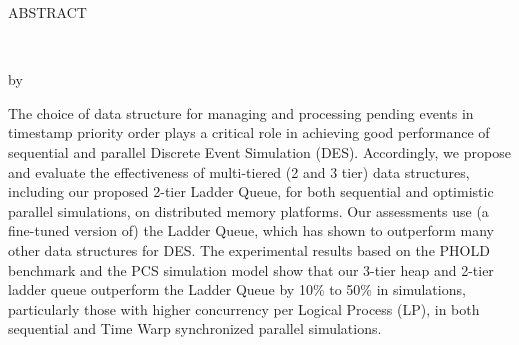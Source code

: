\thispagestyle{empty}
\begin{center}
\MakeUppercase{ABSTRACT}\\
\vspace*{1\baselineskip}

\MakeUppercase{\thetitle}\\
\vspace*{2\baselineskip}

by \theauthor
\end{center}

\vspace*{4\baselineskip}

\begin{flushleft}
  The choice of data structure for managing and processing pending
  events in timestamp priority order plays a critical role in
  achieving good performance of sequential and parallel Discrete Event
  Simulation (DES).  Accordingly, we propose and evaluate the
  effectiveness of multi-tiered (2 and 3 tier) data structures,
  including our proposed 2-tier Ladder Queue, for both sequential and
  optimistic parallel simulations, on distributed memory platforms.
  Our assessments use (a fine-tuned version of) the Ladder Queue,
  which has shown to outperform many other data structures for DES.
  The experimental results based on the PHOLD benchmark and the PCS simulation model show that our
  3-tier heap and 2-tier ladder queue outperform the Ladder Queue by
  10\% to 50\% in simulations, particularly those with higher
  concurrency per Logical Process (LP), in both sequential and Time
  Warp synchronized parallel simulations. 
\end{flushleft}
\clearpage
